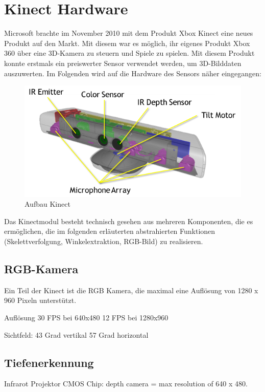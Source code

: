 \section{Kinect Hardware}
Microsoft brachte im November 2010 mit dem Produkt Xbox Kinect eine neues Produkt auf den Markt. Mit diesem war es möglich, ihr eigenes Produkt Xbox 360 über eine 3D-Kamera zu steuern und Spiele zu spielen. 
Mit diesem Produkt konnte erstmals ein preiswerter Sensor verwendet werden, um 3D-Bilddaten auszuwerten.
Im Folgenden wird auf die Hardware des Sensors näher eingegangen:

\begin{figure}[H]						
	\centering							
	\includegraphics[scale=0.9]{Bilder/kinect_sensor_aufbau.png}			
	\caption{Aufbau Kinect\cite{ws:microsoft_kinect}}						
	\label{f:kinect_hardware}						
\end{figure}


Das Kinectmodul besteht technisch gesehen aus mehreren Komponenten, die es ermöglichen, die
im folgenden erläuterten abstrahierten Funktionen (Skelettverfolgung, Winkelextraktion, RGB-Bild)
zu realisieren. \cite{webb2012beginning}

\subsection{RGB-Kamera}

	Ein Teil der Kinect ist die RGB Kamera, die maximal eine Auflösung von 1280 x 960 Pixeln 	
	unterstützt. 
	
	Auflösung
	30 FPS bei 640x480
	12 FPS bei 1280x960
	
	Sichtfeld:
	43 Grad vertikal
	57 Grad horizontal	

\subsection{Tiefenerkennung}
	Infrarot Projektor
	CMOS Chip: depth camera 	= max resolution of 640 x 480.
	
